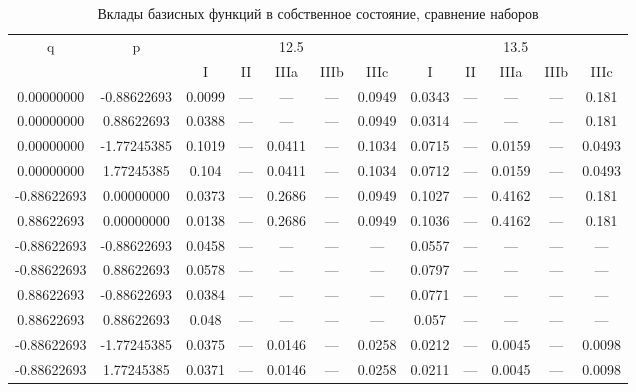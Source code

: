 \documentclass[a4paper,14pt]{extarticle}
\begin{document}
\begin{landscape}
\begin{table}[H]
\centering
\caption{Вклады базисных функций в собственное состояние, сравнение наборов}
\begin{tabular}{|c|c|*{5}{c}|*{5}{c}|}
\hline
\multirow{2}{*}{q} & \multirow{2}{*}{p} & \multicolumn{5}{|c|}{12.5}                  & \multicolumn{5}{|c|}{13.5}                \\
\cline{3-12}
                   &                    & I      & II     & IIIa   & IIIb   & IIIc   & I      & II     & IIIa   & IIIb   & IIIc   \\ 
\hline
 0.00000000        & -0.88622693        & 0.0099 & ---    & ---    & ---    & 0.0949 & 0.0343 & ---    & ---    & ---    & 0.181  \\ 
 0.00000000        &  0.88622693        & 0.0388 & ---    & ---    & ---    & 0.0949 & 0.0314 & ---    & ---    & ---    & 0.181  \\
 0.00000000        & -1.77245385        & 0.1019 & ---    & 0.0411 & ---    & 0.1034 & 0.0715 & ---    & 0.0159 & ---    & 0.0493 \\
 0.00000000        &  1.77245385        & 0.104  & ---    & 0.0411 & ---    & 0.1034 & 0.0712 & ---    & 0.0159 & ---    & 0.0493 \\
-0.88622693        &  0.00000000        & 0.0373 & ---    & 0.2686 & ---    & 0.0949 & 0.1027 & ---    & 0.4162 & ---    & 0.181  \\
 0.88622693        &  0.00000000        & 0.0138 & ---    & 0.2686 & ---    & 0.0949 & 0.1036 & ---    & 0.4162 & ---    & 0.181  \\
-0.88622693        & -0.88622693        & 0.0458 & ---    & ---    & ---    & ---    & 0.0557 & ---    & ---    & ---    & ---    \\
-0.88622693        &  0.88622693        & 0.0578 & ---    & ---    & ---    & ---    & 0.0797 & ---    & ---    & ---    & ---    \\
 0.88622693        & -0.88622693        & 0.0384 & ---    & ---    & ---    & ---    & 0.0771 & ---    & ---    & ---    & ---    \\
 0.88622693        &  0.88622693        & 0.048  & ---    & ---    & ---    & ---    & 0.057  & ---    & ---    & ---    & ---    \\
-0.88622693        & -1.77245385        & 0.0375 & ---    & 0.0146 & ---    & 0.0258 & 0.0212 & ---    & 0.0045 & ---    & 0.0098 \\
-0.88622693        &  1.77245385        & 0.0371 & ---    & 0.0146 & ---    & 0.0258 & 0.0211 & ---    & 0.0045 & ---    & 0.0098 \\

\end{tabular}
\end{table}
\end{landscape}
\end{document}
